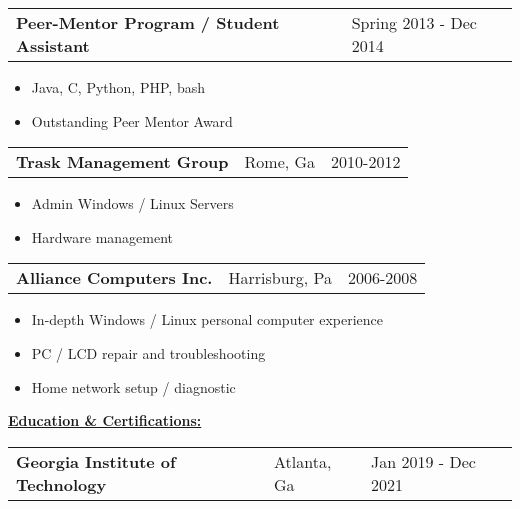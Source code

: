 \documentclass{book}
\newenvironment{myitemize}
{ \begin{itemize}
	\setlength{\itemsep}{0pt}
	\setlength{\parskip}{0pt}
	\setlength{\parsep}{0pt}     }
{ \end{itemize}                  }
\begin{document}
\begin{tabular}{L{4.75in}R{1.75in}}

	{\large {\bfseries Peer-Mentor Program / Student Assistant}} & Spring 2013 - Dec 2014 \\

\end{tabular}

	\begin{myitemize}
		\item Java, C, Python, PHP, bash
		\item Outstanding Peer Mentor Award 
	\end{myitemize} 


\begin{tabular}{L{3in}L{1.75in}R{1.75in}}

	 {\large {\bfseries Trask Management Group}} & Rome, Ga & 2010-2012 \\

\end{tabular}

\begin{myitemize}
	
	\item Admin Windows / Linux Servers

	\item Hardware management

\end{myitemize}

\begin{tabular}{L{3in}L{1.75in}R{1.75in}}

	 {\large {\bfseries Alliance Computers Inc.}} & Harrisburg, Pa & 2006-2008 \\

\end{tabular}

\begin{myitemize}
	
	\item In-depth Windows / Linux personal computer experience
	\item PC / LCD repair and troubleshooting
	\item Home network setup / diagnostic

\end{myitemize}

\underline{\Large {\bfseries Education \& Certifications:}}

\enspace

\begin{tabular}{L{3in}L{1.75in}R{1.75in}}

	{\large {\bfseries Georgia Institute of Technology}} & Atlanta, Ga & Jan 2019 - Dec 2021 \\%

\end{tabular}
\end{document}
